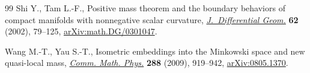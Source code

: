 \documentclass[pdftex]{sigma}
\numberwithin{equation}{section}
\begin{document}
\begin{thebibliography}{99}
Shi Y., Tam L.-F., Positive mass theorem and the boundary behaviors of compact
  manifolds with nonnegative scalar curvature, \href{https://doi.org/10.4310/jdg/1090425530}{\textit{J.~Differential Geom.}}
  \textbf{62} (2002), 79--125, \href{https://arxiv.org/abs/math.DG/0301047}{arXiv:math.DG/0301047}.

Wang M.-T., Yau S.-T., Isometric embeddings into the {M}inkowski space and new
  quasi-local mass, \href{https://doi.org/10.1007/s00220-009-0745-0}{\textit{Comm. Math. Phys.}} \textbf{288} (2009), 919--942,
  \href{https://arxiv.org/abs/0805.1370}{arXiv:0805.1370}.

\end{thebibliography}\LastPageEnding
\end{document}
